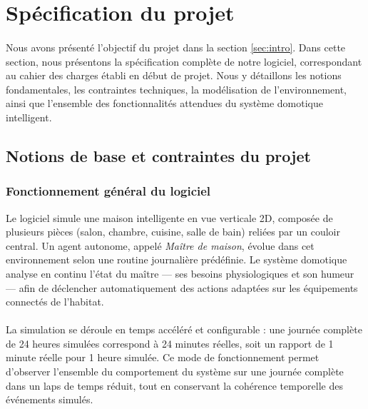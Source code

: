 \newpage
\section{Spécification du projet}
\label{sec:cdc}

\paragraph{} Nous avons présenté l'objectif du projet dans la section \ref{sec:intro}. 
Dans cette section, nous présentons la spécification complète de notre logiciel, correspondant 
au cahier des charges établi en début de projet. Nous y détaillons les notions fondamentales, 
les contraintes techniques, la modélisation de l'environnement, ainsi que l'ensemble des 
fonctionnalités attendues du système domotique intelligent.

\subsection{Notions de base et contraintes du projet}
\label{sec:spec1}

\subsubsection{Fonctionnement général du logiciel}

Le logiciel simule une maison intelligente en vue verticale 2D, composée de plusieurs pièces 
(salon, chambre, cuisine, salle de bain) reliées par un couloir central. Un agent autonome, 
appelé \textit{Maître de maison}, évolue dans cet environnement selon une routine journalière 
prédéfinie. Le système domotique analyse en continu l'état du maître — ses besoins 
physiologiques et son humeur — afin de déclencher automatiquement des actions adaptées sur 
les équipements connectés de l'habitat.

\paragraph{} La simulation se déroule en temps accéléré et configurable : une journée complète 
de 24 heures simulées correspond à 24 minutes réelles, soit un rapport de 1 minute réelle pour 
1 heure simulée. Ce mode de fonctionnement permet d'observer l'ensemble du comportement du 
système sur une journée complète dans un laps de temps réduit, tout en conservant la cohérence 
temporelle des événements simulés.

